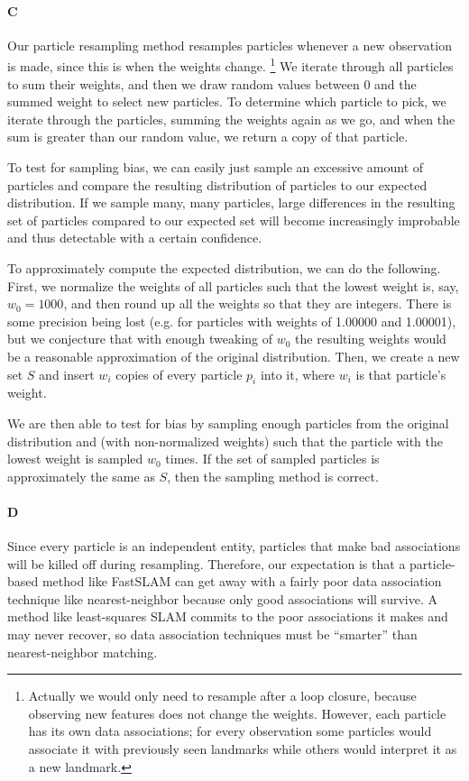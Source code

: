 \documentclass[12pt]{article}
\begin{document}
\paragraph{C} %
Our particle resampling method resamples particles whenever a new observation
is made, since this is when the weights change. \footnote{Actually we would only need to resample
after a loop closure, because observing new features does not change the weights. However,
each particle has its own data associations; for every observation some particles would
associate it with previously seen landmarks while others would interpret it as a new landmark.}
We iterate through all particles to sum their weights, and then we draw random values between 0 and
the summed weight to select new particles. To determine which particle to pick,
we iterate through the particles, summing the weights again as we go, and when
the sum is greater than our random value, we return a copy of that particle.

To test for sampling bias, we can easily just sample an excessive amount of
particles and compare the resulting distribution of particles to our
expected distribution. If we sample many, many particles, large differences
in the resulting set of particles compared to our expected set will become
increasingly improbable and thus detectable with a certain confidence.

To approximately compute the expected distribution, we can do the following. First, we normalize the weights
of all particles such that the lowest weight is, say, $w_0=1000$, and then round up all the weights so
that they are integers. There is some precision being lost (e.g. for particles with weights of 1.00000 and
1.00001), but we conjecture that with enough tweaking of $w_0$
the resulting weights would be
a reasonable approximation of the original distribution. Then, we create a new set $S$ and insert $w_i$
copies of every particle $p_i$ into it, where $w_i$ is that particle's weight.

We are then able to test for bias by sampling enough particles from the original distribution and 
(with non-normalized weights) such that the particle with the lowest weight is sampled $w_0$ times.
If the set of sampled particles is approximately the same as $S$, then the sampling method is correct.

\paragraph{D}
Since every particle is an independent entity, particles that make bad
associations will be killed off during resampling. Therefore, our
expectation is that a particle-based method like FastSLAM can get away
with a fairly poor data association technique like nearest-neighbor
because only good associations will survive. A method like least-squares
SLAM commits to the poor associations it makes and may never recover, so
data association techniques must be ``smarter'' than nearest-neighbor
matching.
\end{document}
